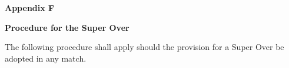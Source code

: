 \documentclass[12pt]{article}
\begin{document}
\vspace{\baselineskip}
\begin{Center}
{\fontsize{11pt}{13.2pt}\selectfont \textbf{Appendix F}\par}
\end{Center}\par


\vspace{\baselineskip}
\begin{adjustwidth}{0.0in}{0.01in}
\begin{Center}
{\fontsize{11pt}{13.2pt}\selectfont \textbf{Procedure for the Super Over}\par}
\end{Center}\par

\end{adjustwidth}


\vspace{\baselineskip}
{\fontsize{9pt}{10.8pt}\selectfont The following procedure shall apply should the provision for a Super Over be adopted in any match.\par}\par
\end{document}
